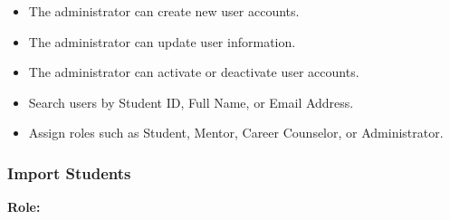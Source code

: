 \begin{itemize}
    \item The administrator can create new user accounts.

    \item The administrator can update user information.

    \item The administrator can activate or deactivate user accounts.

    \item Search users by Student ID, Full Name, or Email Address.

    \item Assign roles such as Student, Mentor, Career Counselor, or Administrator.
\end{itemize}

%

%

%

\subsubsection{Import Students}

\textbf{Role:}

